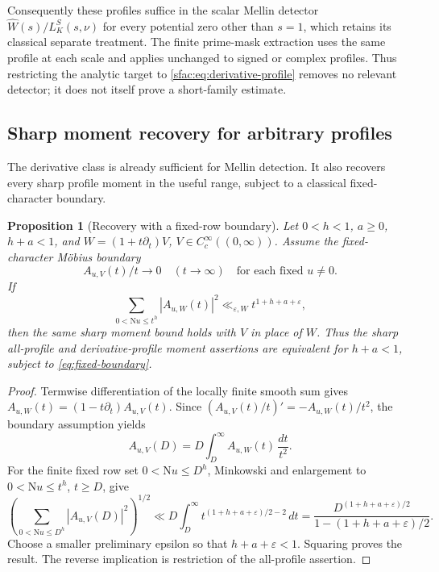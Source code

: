 \documentclass[11pt]{article}
\numberwithin{equation}{section}
\newtheorem{proposition}[theorem]{Proposition}
\theoremstyle{definition}
\theoremstyle{remark}
\newcommand{\N}{\mathrm N}
\newcommand{\eps}{\varepsilon}
\begin{document}
Consequently these profiles suffice in the scalar Mellin detector
$\widehat W(s)/L_K^S(s,\nu)$ for every potential zero other than
$s=1$, which retains its classical separate treatment.  The finite
prime-mask extraction uses the same profile at each scale and applies
unchanged to signed or complex profiles.  Thus restricting the analytic
target to \eqref{sfac:eq:derivative-profile} removes no relevant detector;
it does not itself prove a short-family estimate.


\subsection{Sharp moment recovery for arbitrary profiles}
\label{sec:profile-recovery}

The derivative class is already sufficient for Mellin detection.
It also recovers every sharp profile moment in the useful range,
subject to a classical fixed-character boundary.

\begin{proposition}[Recovery with a fixed-row boundary]
\label{prop:sharp-recovery}
Let \(0<h<1\), \(a\ge0\), \(h+a<1\), and
\(W=(1+t\partial_t)V\), \(V\in C_c^\infty((0,\infty))\).
Assume the fixed-character M\"obius boundary
\begin{equation}\label{eq:fixed-boundary}
 A_{u,V}(t)/t\longrightarrow0\quad(t\longrightarrow\infty)
 \quad\text{for each fixed }u\ne0.
\end{equation}
If
\[
 \sum_{0<\N u\le t^h}|A_{u,W}(t)|^2
       \ll_{\eps,W}t^{1+h+a+\eps},
\]
then the same sharp moment bound holds with \(V\) in place of \(W\).
Thus the sharp all-profile and derivative-profile moment assertions
are equivalent for \(h+a<1\), subject to \eqref{eq:fixed-boundary}.
\end{proposition}
\begin{proof}
Termwise differentiation of the locally finite smooth sum gives
\(A_{u,W}(t)=(1-t\partial_t)A_{u,V}(t)\).
Since \((A_{u,V}(t)/t)'=-A_{u,W}(t)/t^2\),
the boundary assumption yields
\begin{equation}\label{eq:profile-integral-recovery}
 A_{u,V}(D)=D\int_D^\infty A_{u,W}(t)\,\frac{dt}{t^2}.
\end{equation}
For the finite fixed row set \(0<\N u\le D^h\), Minkowski and
enlargement to \(0<\N u\le t^h\), \(t\ge D\), give
\[
 \left(\sum_{0<\N u\le D^h}|A_{u,V}(D)|^2\right)^{1/2}
 \ll D\int_D^\infty t^{(1+h+a+\eps)/2-2}\,dt
 =\frac{D^{(1+h+a+\eps)/2}}
        {1-(1+h+a+\eps)/2}.
\]
Choose a smaller preliminary epsilon so that \(h+a+\eps<1\).
Squaring proves the result. The reverse implication is restriction
of the all-profile assertion.
\end{proof}
\end{document}
